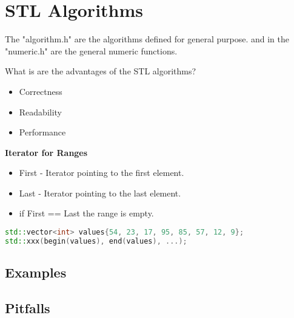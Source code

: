 \section{STL Algorithms}
The "algorithm.h" are the algorithms defined for general purpose. and in the "numeric.h" are the general numeric functions.

What is are the advantages of the STL algorithms?
\begin{itemize}
	\itemsep -0.5em 
	\item Correctness
	\item Readability
	\item Performance
\end{itemize}

\textbf{Iterator for Ranges}
\begin{itemize}
  \itemsep 0em 
  \item First - Iterator pointing to the first element.
  \item Last - Iterator pointing to the last element.
  \item if First == Last the range is empty.
\end{itemize}

\begin{lstlisting}[language=C++]
std::vector<int> values{54, 23, 17, 95, 85, 57, 12, 9}; 
std::xxx(begin(values), end(values), ...);
\end{lstlisting}

\subsection{Examples}

\subsection{Pitfalls}
